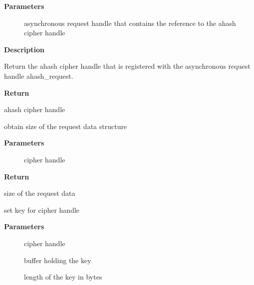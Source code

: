 \documentclass[a4paper,8pt,english]{sphinxmanual}
\begin{document}
\textbf{Parameters}
\begin{description}
\item[{}] \leavevmode
asynchronous request handle that contains the reference to the ahash
cipher handle

\end{description}

\textbf{Description}

Return the ahash cipher handle that is registered with the asynchronous
request handle ahash\_request.

\textbf{Return}

ahash cipher handle

\begin{fulllineitems}
\label{crypto/api-digest:c.crypto_ahash_reqsize}
obtain size of the request data structure

\end{fulllineitems}


\textbf{Parameters}
\begin{description}
\item[{}] \leavevmode
cipher handle

\end{description}

\textbf{Return}

size of the request data

\begin{fulllineitems}
\label{crypto/api-digest:c.crypto_ahash_setkey}
set key for cipher handle

\end{fulllineitems}


\textbf{Parameters}
\begin{description}
\item[{}] \leavevmode
cipher handle

\item[{}] \leavevmode
buffer holding the key

\item[{}] \leavevmode
length of the key in bytes

\end{description}
\end{document}
